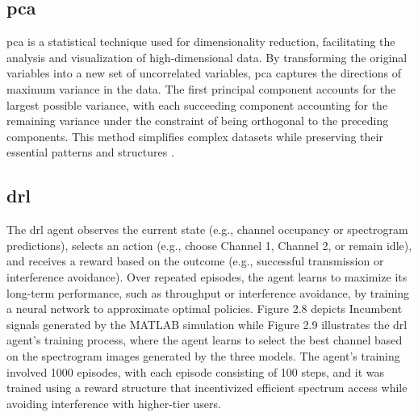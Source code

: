 \subsection{\gls{pca}}
\gls{pca} is a statistical technique used for dimensionality reduction, facilitating the analysis and visualization of high-dimensional data. By transforming the original variables into a new set of uncorrelated variables, \gls{pca} captures the directions of maximum variance in the data. The first principal component accounts for the largest possible variance, with each succeeding component accounting for the remaining variance under the constraint of being orthogonal to the preceding components. This method simplifies complex datasets while preserving their essential patterns and structures \cite{12}.

\subsection{\gls{drl}}
The \gls{drl} agent observes the current state (e.g., channel occupancy or spectrogram predictions), selects an action (e.g., choose Channel 1, Channel 2, or remain idle), and receives a reward based on the outcome (e.g., successful transmission or interference avoidance). Over repeated episodes, the agent learns to maximize its long-term performance, such as throughput or interference avoidance, by training a neural network to approximate optimal policies. Figure 2.8 depicts Incumbent signals generated by the MATLAB simulation while Figure 2.9 illustrates the \gls{drl} agent's training process, where the agent learns to select the best channel based on the spectrogram images generated by the three models. The agent's training involved 1000 episodes, with each episode consisting of 100 steps, and it was trained using a reward structure that incentivized efficient spectrum access while avoiding interference with higher-tier users.


